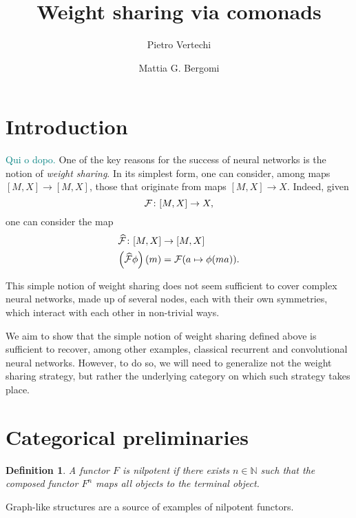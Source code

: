 \documentclass[12pt]{article}
\title{Weight sharing via comonads}
\author{
    Pietro Vertechi \and Mattia G. Bergomi
}
\date{}
\newtheorem{definition}{Definition}
\newcommand{\pietro}[1]{\textcolor{teal}{#1}}
\newcommand{\N}{{\mathbb{N}}}
\begin{document}
\maketitle
\begin{abstract}
\end{abstract}

\section{Introduction}

\pietro{Qui o dopo.}
One of the key reasons for the success of neural networks is the notion of {\em weight sharing}. In its simplest form, one can consider, among maps $[M, X] \rightarrow [M, X]$, those that originate from maps $[M, X] \rightarrow X$. Indeed, given
\begin{equation*}
    {\cal F} \colon [M, X] \rightarrow X,
\end{equation*}
one can consider the map
\begin{align*}
    \widehat{\cal F} \colon [M, X]       & \rightarrow [M, X]              \\
    \left(\widehat{\cal F}\phi\right)(m) & = {\cal F}(a \mapsto \phi(ma)).
\end{align*}

This simple notion of weight sharing does not seem sufficient to cover complex neural networks, made up of several nodes, each with their own symmetries, which interact with each other in non-trivial ways.

We aim to show that the simple notion of weight sharing defined above is sufficient to recover, among other examples, classical recurrent and convolutional neural networks. However, to do so, we will need to generalize not the weight sharing strategy, but rather the underlying category on which such strategy takes place.

\section{Categorical preliminaries}

\begin{definition}\label{def:nilpotent_functor}
    A functor $F$ is {\em nilpotent} if there exists $n \in \N$ such that the composed functor $F^n$ maps all objects to the terminal object.
\end{definition}

Graph-like structures are a source of examples of nilpotent functors.
\end{document}

